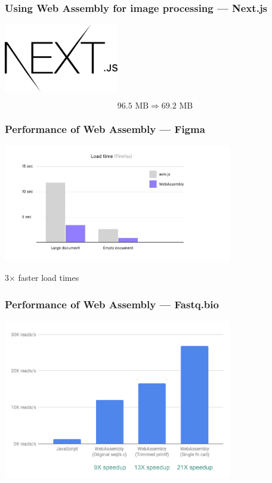 \documentclass{beamer}
\begin{document}
\begin{frame}
    \frametitle{Using Web Assembly for image processing — Next.js \cite{nextjs}}
    \begin{center}
        \includegraphics[width=5cm]{nextjs.png}

    \end{center}

    $$
        96.5 \text{ MB} \Rightarrow 69.2 \text{ MB}
    $$
\end{frame}

\begin{frame}
    \frametitle{Performance of Web Assembly — Figma \cite{figmawasm}}
    \begin{center}
        \includegraphics[width=10cm]{figma_perf.png}

    \end{center}

    \begin{center}
        3$\times$ faster load times
    \end{center}
\end{frame}

\begin{frame}
    \frametitle{Performance of Web Assembly — Fastq.bio \cite{fastq}}
    \begin{center}
        \includegraphics[width=10cm]{fastq.png}

    \end{center}
\end{frame}
\end{document}
